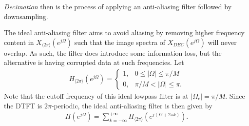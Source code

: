 \documentclass{report}
\begin{document}
\pagebreak
\noindent\emph{Decimation} then is the process of applying an anti-aliasing filter followed by downsampling.
\begin{center}
\end{center}
The ideal anti-aliasing filter aims to avoid aliasing by removing higher frequency content in $X_{\langle 2\pi\rangle}(e^{j\Omega})$ such that the image spectra 
of $X_{DEC}(e^{j\Omega})$ will never overlap. As such, the filter does introduce some information loss, but the alternative is having corrupted data at such frequencies. 
Let 
\begin{align}
    H_{\langle 2\pi\rangle}(e^{j\Omega}) = 
    \begin{cases}
        1, & 0\leq|\Omega|\leq\pi/M \\
        0, & \pi/M<|\Omega|\leq\pi.
    \end{cases}
\end{align}
Note that the cutoff frequency of this ideal lowpass filter is at $|\Omega_c|=\pi/M$. Since the DTFT is $2\pi$-periodic, the ideal anti-aliasing filter is then given by 
\begin{align}
    H(e^{j\Omega}) = \sum_{k=-\infty}^{+\infty} H_{\langle 2\pi\rangle}(e^{j(\Omega+2\pi k)}).
\end{align}
\end{document}
